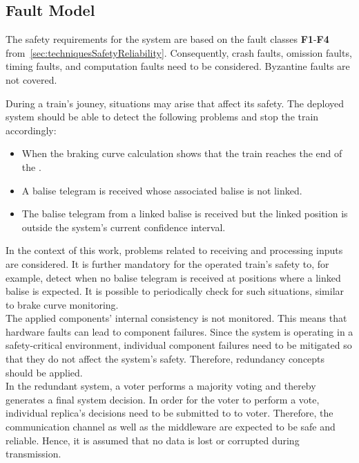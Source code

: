 \subsection{Fault Model}
\label{subsec:faultModel}
The safety requirements for the system are based on the fault classes \textbf{F1}-\textbf{F4} from~\autoref{sec:techniquesSafetyReliability}\cite{CristianFaultModel}.
Consequently, crash faults, omission faults, timing faults, and computation faults need to be considered.
Byzantine faults are not covered.

During a train's jouney, situations may arise that affect its safety.
The deployed system should be able to detect the following problems and stop the train accordingly:

\begin{itemize}
\item When the braking curve calculation shows that the train reaches the end of the .
\item A balise telegram is received whose associated balise is not linked.
\item The balise telegram from a linked balise is received but the linked position is outside the system's current confidence interval.
\end{itemize}

In the context of this work, problems related to receiving and processing inputs are considered.
It is further mandatory for the operated train's safety to, for example, detect when no balise telegram is received at positions where a linked balise is expected.
It is possible to periodically check for such situations, similar to brake curve monitoring.
\\

The applied components' internal consistency is not monitored.
This means that hardware faults can lead to component failures.
Since the system is operating in a safety-critical environment, individual component failures need to be mitigated so that they do not affect the system's safety.
Therefore, redundancy concepts should be applied.
\\

In the redundant system, a voter performs a majority voting and thereby generates a final system decision.
In order for the voter to perform a vote, individual replica's decisions need to be submitted to to voter.
Therefore, the communication channel as well as the  middleware are expected to be safe and reliable.
Hence, it is assumed that no data is lost or corrupted during transmission.
\\

